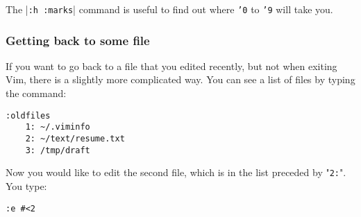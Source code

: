 The |\texttt{:h :marks}| command is useful to find out where \texttt{'0} to \texttt{'9} will take you.

\subsubsection{Getting back to some file}
If you want to go back to a file that you edited recently, but not when exiting Vim, there is a slightly more complicated way.
You can see a list of files by typing the command:

\begin{Verbatim}[samepage=true]
 :oldfiles
    1: ~/.viminfo 
    2: ~/text/resume.txt 
    3: /tmp/draft 
\end{Verbatim}

Now you would like to edit the second file, which is in the list preceded by "\verb!2:!".
You type:

\begin{Verbatim}[samepage=true]
 :e #<2
\end{Verbatim}

